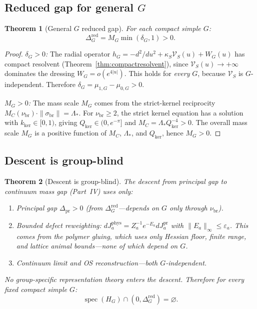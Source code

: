 \documentclass[12pt]{article}
\theoremstyle{plain}
\newtheorem{theorem}{Theorem}[section]
\theoremstyle{definition}
\numberwithin{equation}{section}
\newcommand{\spec}{\operatorname{spec}}
\newcommand{\pr}{\mathrm{pr}}
\newcommand{\phys}{\mathrm{phys}}
\newcommand{\red}{\mathrm{red}}
\newcommand{\br}{\mathrm{br}}
\newcommand{\kker}{\mathrm{ker}}
\begin{document}
\subsection{Reduced gap for general $G$}

\begin{theorem}[General $G$ reduced gap]\label{thm:generalGgap}
For each compact simple $G$:
\begin{equation}
\Delta_G^{\red} = M_G\min(\delta_G,1) > 0.
\end{equation}
\end{theorem}

\begin{proof}
\emph{$\delta_G>0$:}  The radial operator $h_G=-d^2/du^2+\kappa_S\mathcal{V}_S(u)+W_G(u)$ has compact resolvent (Theorem~\ref{thm:compactresolvent}), since $\mathcal{V}_S(u)\to+\infty$ dominates the dressing $W_G=o(e^{4|u|})$.  This holds for \emph{every} $G$, because $\mathcal{V}_S$ is $G$-independent.  Therefore $\delta_G=\mu_{1,G}-\mu_{0,G}>0$.

\emph{$M_G>0$:}  The mass scale $M_G$ comes from the strict-kernel reciprocity $M_C(\nu_{\br})\cdot\|\sigma_{\br}\|=\Lambda_*$.  For $\nu_{\br}\geq 2$, the strict kernel equation has a solution with $k_{\kker}\in[0,1)$, giving $Q_{\kker}\in(0,e^{-\pi}]$ and $M_C=\Lambda_* Q_{\kker}^{-4}>0$.  The overall mass scale $M_G$ is a positive function of $M_C$, $\Lambda_*$, and $Q_{\kker}$, hence $M_G>0$.
\end{proof}

\subsection{Descent is group-blind}

\begin{theorem}[Descent is group-blind]\label{thm:groupblind}
The descent from principal gap to continuum mass gap (Part~IV) uses only:
\begin{enumerate}[label=(\roman*)]
\item Principal gap $\Delta_{\pr}>0$ (from $\Delta_G^{\red}$---depends on $G$ only through $\nu_{\br}$).
\item Bounded defect reweighting: $dJ_a^{\phys}=Z_a^{-1}e^{-E_a}dJ_a^{\pr}$ with $\|E_a\|_\infty\leq\varepsilon_a$.  This comes from the polymer gluing, which uses only Hessian floor, finite range, and lattice animal bounds---none of which depend on $G$.
\item Continuum limit and OS reconstruction---both $G$-independent.
\end{enumerate}
No group-specific representation theory enters the descent.  Therefore for every fixed compact simple $G$:
\begin{equation}
\boxed{\spec(H_G)\cap(0,\Delta_G^{\red})=\varnothing.}
\end{equation}
\end{theorem}
\end{document}
